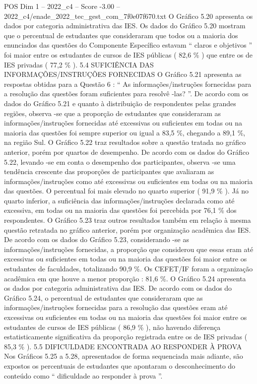 \begin{textsample}{POS Dim 1 – 2022\_c4 – Score -3.00 – 2022\_c4/enade\_2022\_tec\_gest\_com\_7f0e07f670.txt}
O Gráfico 5.20 apresenta os dados por categoria administrativa das IES.
Os dados do Gráfico 5.20 mostram que o percentual de estudantes que consideraram que todos ou a maioria dos enunciados das questões do Componente Específico estavam “ claros e objetivos ” foi maior entre os estudantes de cursos de IES públicas ( 82,6 \% ) que entre os de IES privadas ( 77,2 \% ). 5.4 SUFICIÊNCIA DAS INFORMAÇÕES/INSTRUÇÕES FORNECIDAS O Gráfico 5.21 apresenta as respostas obtidas para a Questão 6 : “ As informações/instruções fornecidas para a resolução das questões foram suficientes para resolvê -las? ”.
De acordo com os dados do Gráfico 5.21 e quanto à distribuição de respondentes pelas grandes regiões, observa -se que a proporção de estudantes que consideraram as informações/instruções fornecidas até excessivas ou suficientes em todas ou na maioria das questões foi sempre superior ou igual a 83,5 \%, chegando a 89,1 \%, na região Sul.
O Gráfico 5.22 traz resultados sobre a questão tratada no gráfico anterior, porém por quartos de desempenho.
De acordo com os dados do Gráfico 5.22, levando -se em conta o desempenho dos participantes, observa -se uma tendência crescente das proporções de participantes que avaliaram as informações/instruções como até excessivas ou suficientes em todas ou na maioria das questões.
O percentual foi mais elevado no quarto superior ( 91,9 \% ).
Já no quarto inferior, a suficiência das informações/instruções declarada como até excessiva, em todas ou na maioria das questões foi percebida por 76,1 \% dos respondentes.
O Gráfico 5.23 traz outros resultados também em relação à mesma questão retratada no gráfico anterior, porém por organização acadêmica das IES.
De acordo com os dados do Gráfico 5.23, considerando -se as informações/instruções fornecidas, a proporção que considerou que essas eram até excessivas ou suficientes em todas ou na maioria das questões foi maior entre os estudantes de faculdades, totalizando 90,9 \%.
Os CEFET/IF foram a organização acadêmica em que houve a menor proporção : 81,6 \%.
O Gráfico 5.24 apresenta os dados por categoria administrativa das IES.
De acordo com os dados do Gráfico 5.24, o percentual de estudantes que consideraram que as informações/instruções fornecidas para a resolução das questões eram até excessivas ou suficientes em todas ou na maioria das questões foi maior entre os estudantes de cursos de IES públicas ( 86,9 \% ), não havendo diferença estatisticamente significativa da proporção registrada entre os de IES privadas ( 85,3 \% ). 5.5 DIFICULDADE ENCONTRADA AO RESPONDER À PROVA Nos Gráficos 5.25 a 5.28, apresentados de forma sequenciada mais adiante, são expostos os percentuais de estudantes que apontaram o desconhecimento do conteúdo como “ dificuldade ao responder à prova ”.

\end{textsample}

